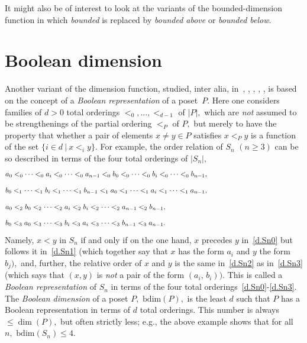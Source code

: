 \documentclass{amsart}
\numberwithin{equation}{section}
\numberwithin{theorem}{section}
\renewcommand{\r}{\mathrm}
\newcommand{\2}{\mathbf{2}}
\begin{document}
It might also be of interest to look at the variants
of the bounded-dimension function in which {\em bounded} is replaced by
{\em bounded above} or {\em bounded below}.

\section{Boolean dimension}\label{S.Boolean}

Another variant of the dimension function, studied,
inter alia, in~\cite{comparing}, \cite{5/6}, \cite{G+N+T},
\cite{boolean}, \cite{T+W}, is based on the concept of a
{\em Boolean representation} of a poset~$P.$
Here one considers families of $d>0$ total orderings
$<_0,\dots,<_{d-1}$ of $|P|,$ which are {\em not} assumed
to be strengthenings of the partial
ordering $<_P$ of $P,$ but merely to have the
property that whether a pair of elements $x\neq y\in P$
satisfies $x<_P y$ is a function of the
set $\{i\in d~|~x<_i y\}.$
For example, the order relation of $S_n$ $(n\geq 3)$
can be so described in terms of the four total orderings of $|S_n|,$
%
\begin{equation}\begin{minipage}[c]{35pc}\label{d.Sn0}
$a_0 <_0 \dots <_0 a_i <_0 \dots <_0 a_{n-1} <_0
b_0 <_0 \dots <_0 b_i <_0 \dots <_0 b_{n-1},$
\end{minipage}\end{equation}
%
\begin{equation}\begin{minipage}[c]{35pc}\label{d.Sn1}
$b_0 <_1 \dots <_1 b_i <_1 \dots <_1 b_{n-1} <_1
a_0 <_1 \dots <_1 a_i <_1 \dots <_1 a_{n-1},$
\end{minipage}\end{equation}
%
\begin{equation}\begin{minipage}[c]{35pc}\label{d.Sn2}
$a_0 <_2 b_0 <_2 \dots <_2 a_i <_2 b_i <_2
\dots <_2 a_{n-1} <_2 b_{n-1},$
\end{minipage}\end{equation}
%
\begin{equation}\begin{minipage}[c]{35pc}\label{d.Sn3}
$b_0 <_3 a_0 <_3 \dots <_3 b_i <_3 a_i <_3
\dots <_3 b_{n-1} <_3 a_{n-1}.$
\end{minipage}\end{equation}
%
Namely, $x < y$ in $S_n$ if and only
if on the one hand, $x$ precedes $y$
in~\eqref{d.Sn0} but follows it in~\eqref{d.Sn1} (which together
say that $x$ has the form $a_i$ and $y$ the form $b_j),$
and, further, the relative order of $x$ and
$y$ is the same in~\eqref{d.Sn2} as in~\eqref{d.Sn3} (which says
that $(x,y)$ is {\em not} a pair of the form $(a_i,\,b_i)).$
This is called a {\em Boolean representation} of $S_n$ in
terms of the four total orderings~\eqref{d.Sn0}-\eqref{d.Sn3}.
The {\em Boolean dimension} of a poset $P,$ $\r{bdim}(P),$
is the least $d$ such
that $P$ has a Boolean representation in terms of $d$ total orderings.
This number is always $\leq\dim(P),$ but often strictly less;
e.g., the above example shows that for all $n,$ $\r{bdim}(S_n)\leq 4.$
\end{document}
